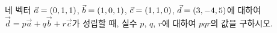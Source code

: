 네 벡터 $\vec{a}=(0{,}\mkern3mu\mathopen{}1{,}\mkern3mu\mathopen{}1)$, $\vec{b}=(1{,}\mkern3mu\mathopen{}0{,}\mkern3mu\mathopen{}1)$, $\vec{c}=(1{,}\mkern3mu\mathopen{}1{,}\mkern3mu\mathopen{}0)$, $\vec{d}=(3{,}\mkern3mu\mathopen{}-4{,}\mkern3mu\mathopen{}5)$에 대하여 $\vec{d}=p\vec{a}+q\vec{b}+r\vec{c}$가 성립할 때, 실수 $p$, $q$, $r$에 대하여 $pqr$의 값을 구하시오.
